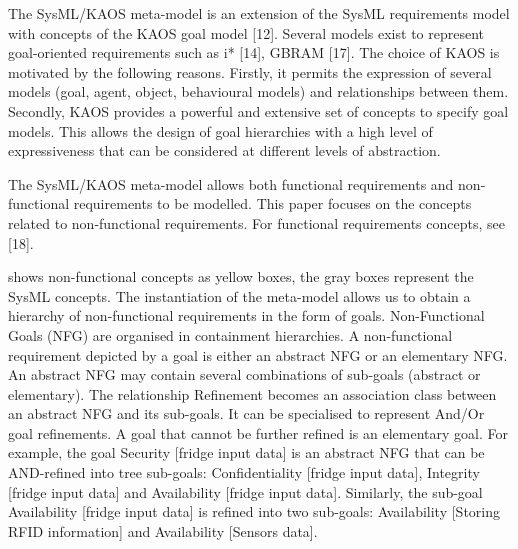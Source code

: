 
The SysML/KAOS meta-model is an extension of the SysML requirements model with concepts of the KAOS goal model [12]. Several models exist to represent goal-oriented requirements such as i* [14], GBRAM [17]. The choice of KAOS is motivated by the following reasons. Firstly, it permits the expression of several models (goal, agent, object, behavioural models) and relationships between them. Secondly, KAOS provides a powerful and extensive set of concepts to specify goal models. This allows the design of goal hierarchies with a high level of expressiveness that can be considered at different levels of abstraction.

The SysML/KAOS meta-model allows both functional requirements and non-functional requirements to be modelled. This paper focuses on the concepts related to non-functional requirements. For functional requirements concepts, see [18].

 shows non-functional concepts as yellow boxes, the gray boxes represent the SysML concepts. The instantiation of the meta-model allows us to obtain a hierarchy of non-functional requirements in the form of goals. Non-Functional Goals (NFG) are organised in containment hierarchies. A non-functional requirement depicted by a goal is either an abstract NFG or an elementary NFG. An abstract NFG may contain several combinations of sub-goals (abstract or elementary). The relationship Refinement becomes an association class between an abstract NFG and its sub-goals. It can be specialised to represent And/Or goal refinements. A goal that cannot be further refined is an elementary goal. 
For example, the goal Security [fridge input data] is an abstract NFG that can be AND-refined into tree sub-goals: Confidentiality [fridge input data], Integrity [fridge input data] and Availability [fridge input data]. Similarly, the sub-goal Availability [fridge input data] is refined into two sub-goals: Availability [Storing RFID information] and Availability [Sensors data].

